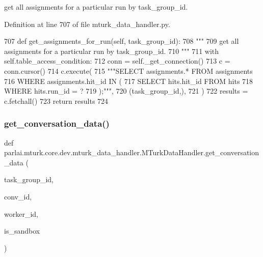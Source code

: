 \begin{DoxyVerb}get all assignments for a particular run by task_group_id.
\end{DoxyVerb}
 

Definition at line 707 of file mturk\+\_\+data\+\_\+handler.\+py.


\begin{DoxyCode}
707     \textcolor{keyword}{def }get\_assignments\_for\_run(self, task\_group\_id):
708         \textcolor{stringliteral}{"""}
709 \textcolor{stringliteral}{        get all assignments for a particular run by task\_group\_id.}
710 \textcolor{stringliteral}{        """}
711         with self.table\_access\_condition:
712             conn = self.\_get\_connection()
713             c = conn.cursor()
714             c.execute(
715                 \textcolor{stringliteral}{"""SELECT assignments.* FROM assignments}
716 \textcolor{stringliteral}{                         WHERE assignments.hit\_id IN (}
717 \textcolor{stringliteral}{                           SELECT hits.hit\_id FROM hits}
718 \textcolor{stringliteral}{                           WHERE hits.run\_id = ?}
719 \textcolor{stringliteral}{                         );"""},
720                 (task\_group\_id,),
721             )
722             results = c.fetchall()
723             \textcolor{keywordflow}{return} results
724 
\end{DoxyCode}
\mbox{\label{classparlai_1_1mturk_1_1core_1_1dev_1_1mturk__data__handler_1_1MTurkDataHandler_af46969088769ed561fd4206e729aecf9}} 
\subsubsection{\texorpdfstring{get\+\_\+conversation\+\_\+data()}{get\_conversation\_data()}}
{\footnotesize\ttfamily def parlai.\+mturk.\+core.\+dev.\+mturk\+\_\+data\+\_\+handler.\+M\+Turk\+Data\+Handler.\+get\+\_\+conversation\+\_\+data (\begin{DoxyParamCaption}\item[{}]{task\+\_\+group\+\_\+id,  }\item[{}]{conv\+\_\+id,  }\item[{}]{worker\+\_\+id,  }\item[{}]{is\+\_\+sandbox }\end{DoxyParamCaption})\hspace{0.3cm}{\ttfamily [static]}}

